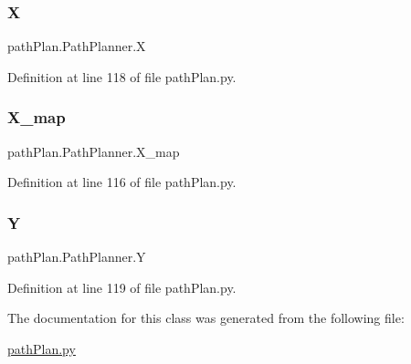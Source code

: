 \subsubsection{\texorpdfstring{X}{X}}
{\footnotesize\ttfamily path\+Plan.\+Path\+Planner.\+X}



Definition at line 118 of file path\+Plan.\+py.

\mbox{\label{classpath_plan_1_1_path_planner_a726f4b4f55f7fb557eabceb962e25871}} 
\subsubsection{\texorpdfstring{X\+\_\+map}{X\_map}}
{\footnotesize\ttfamily path\+Plan.\+Path\+Planner.\+X\+\_\+map}



Definition at line 116 of file path\+Plan.\+py.

\mbox{\label{classpath_plan_1_1_path_planner_a4e78ffd0fb9df91a15d01ca5cb615d24}} 
\subsubsection{\texorpdfstring{Y}{Y}}
{\footnotesize\ttfamily path\+Plan.\+Path\+Planner.\+Y}



Definition at line 119 of file path\+Plan.\+py.



The documentation for this class was generated from the following file\+:\begin{DoxyCompactItemize}
\item 
\mbox{\hyperlink{path_plan_8py}{path\+Plan.\+py}}\end{DoxyCompactItemize}
